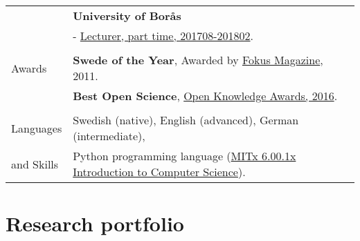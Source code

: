 \documentclass[a4paper,11pt,oneside]{article}
\begin{document}
\begin{tabular}{@{} l l}
     &\textbf{University of Borås} \\
     & - \href{http://files.christopherkullenberg.se/anstallningsbeslutboras.pdf}{Lecturer, part time, 201708-201802}. \\
     & \\
 \Large{Awards}   & \textbf{Swede of the Year}, Awarded by \href{http://www.fokus.se/2011/12/med-datorn-som-vapen/}{Fokus Magazine}, 2011.
                  &\\
                  & \textbf{Best Open Science}, \href{http://www.mynewsdesk.com/se/pressreleases/1st-annual-open-knowledge-awards-announces-the-winners-1684562}{Open Knowledge Awards, 2016}.\\
                  & \\
  \Large{Languages}   & Swedish (native), English (advanced), German (intermediate), \\
\Large{and Skills}    & Python programming language (\href{https://courses.edx.org/certificates/f9c30b3913be4004b95813db59432509}{MITx 6.00.1x Introduction to Computer Science}).  \\
\end{tabular}


\newpage
\tableofcontents
\newpage




%


\renewcommand{\thesection}{\arabic{section}}
\clearpage
\newpage
\setlength\parindent{0cm}
\section{Research portfolio}
\end{document}
